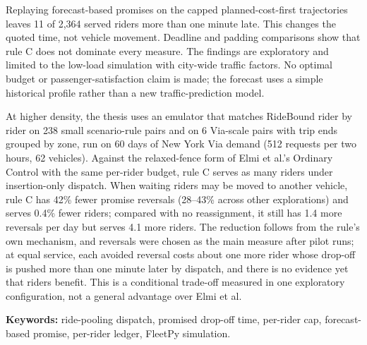 Replaying forecast-based promises on the capped planned-cost-first trajectories leaves 11 of 2,364 served
riders more than one minute late. This changes the quoted time, not vehicle movement. Deadline and padding
comparisons show that rule C does not dominate every measure. The findings are exploratory and limited to the
low-load simulation with city-wide traffic factors. No optimal budget or passenger-satisfaction claim is made;
the forecast uses a simple historical profile rather than a new traffic-prediction model.

At higher density, the thesis uses an emulator that matches RideBound rider by rider on 238 small scenario-rule
pairs and on 6 Via-scale pairs with trip ends grouped by zone, run on 60 days of New York Via demand (512 requests
per two hours, 62 vehicles). Against the relaxed-fence form of Elmi et al.'s Ordinary Control with the same
per-rider budget, rule C serves as many riders under insertion-only dispatch. When waiting riders may be moved to
another vehicle, rule C has 42\% fewer promise reversals (28--43\% across other explorations) and serves 0.4\%
fewer riders; compared with no reassignment, it still has 1.4 more reversals per day but serves 4.1 more riders.
The reduction follows from the rule's own mechanism, and reversals were chosen as the main measure after pilot
runs; at equal service, each avoided reversal costs about one more rider whose drop-off is pushed more than one
minute later by dispatch, and there is no evidence yet that riders benefit. This is a conditional trade-off
measured in one exploratory configuration, not a general advantage over Elmi et al.

\vspace{6pt}
\noindent\textbf{Keywords:} ride-pooling dispatch, promised drop-off time, per-rider cap, forecast-based promise,
per-rider ledger, FleetPy simulation.
\clearpage
